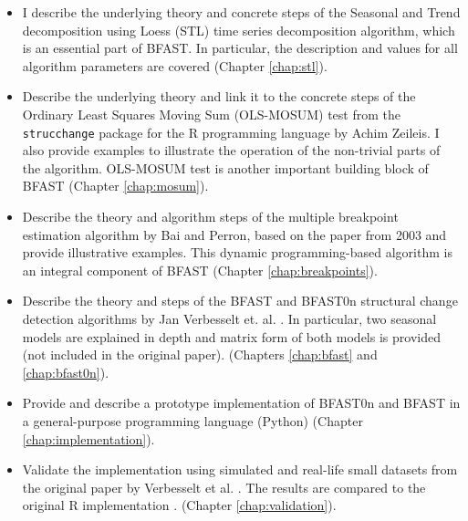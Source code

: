\documentclass[main.tex]{subfiles}
\begin{document}
\begin{itemize}
\item I describe the underlying theory and concrete steps of the
  Seasonal and Trend decomposition using Loess (STL)
  time series decomposition algorithm, which is an essential part of BFAST.
  In particular, the description and values for all algorithm parameters are
  covered (Chapter \ref{chap:stl}).
\item Describe the underlying theory and link it to the concrete steps of
  the Ordinary Least Squares Moving Sum (OLS-MOSUM) test from the
  \texttt{strucchange} package \cite{strucchange} for the R programming
  language by Achim Zeileis. I also provide examples to illustrate the
  operation of the non-trivial parts of the algorithm. OLS-MOSUM test is another
  important building block of BFAST (Chapter \ref{chap:mosum}).
\item Describe the theory and algorithm steps of the multiple
  breakpoint estimation algorithm by Bai and Perron, based on the paper from 2003 \cite{bai_perron}
  and provide illustrative examples. This dynamic programming-based algorithm is
  an integral component of BFAST (Chapter \ref{chap:breakpoints}).
\item Describe the theory and steps of the BFAST and BFAST0n structural change
  detection algorithms by Jan Verbesselt et. al. \cite{bfast}. In particular,
  two seasonal models are explained in depth and matrix form of both models is
  provided (not included in the original paper).
  (Chapters \ref{chap:bfast} and \ref{chap:bfast0n}).
\item Provide and describe a prototype implementation of BFAST0n and BFAST in a
  general-purpose programming language (Python) (Chapter \ref{chap:implementation}).
\item Validate the implementation using simulated and real-life small
  datasets from the original paper by Verbesselt et al. \cite{bfast}.
  The results are compared to the original R implementation \cite{bfast-github}.
  (Chapter \ref{chap:validation}). 
\end{itemize}

\biblio
\end{document}
